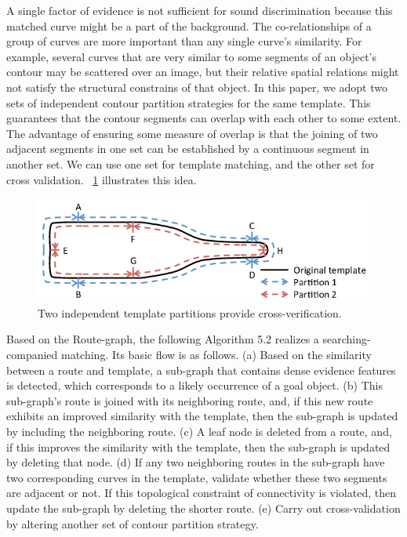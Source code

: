 \documentclass[journal]{IEEEtran}
\begin{document}
A single factor of evidence is not sufficient for sound discrimination because this matched curve might be a part of the background. 
The co-relationships of a group of curves are more important than any single curve's similarity. 
For example, several curves that are very similar to some segments of an object's contour may be scattered over an image, but their relative spatial relations might not satisfy the structural constrains of that object. 
In this paper, we adopt two sets of independent contour partition strategies for the same template. This guarantees that the contour segments can overlap with each other to some extent. The advantage of ensuring some measure of overlap is that the joining of two adjacent segments in one set can be established by a continuous segment in another set.
We can use one set for template matching, and the other set for cross validation. 
\figurename~\ref{fig:16} illustrates this idea.

\begin{figure}[!t]
\centering
\includegraphics[width=0.7\linewidth]{images/fig16.png}
\caption{Two independent template partitions provide cross-verification.}
\label{fig:16}
\end{figure}

Based on the Route-graph, the following Algorithm 5.2 realizes a searching-companied matching. 
Its basic flow is as follows. 
(a) Based on the similarity between a route and template, 
a sub-graph that contains dense evidence features is detected, 
which corresponds to a likely occurrence of a goal object. 
(b) This sub-graph's route is joined with its neighboring route, 
and, if this new route exhibits an improved similarity with the template, 
then the sub-graph is updated by including the neighboring route. 
(c) A leaf node is deleted from a route, 
and, if this improves the similarity with the template, 
then the sub-graph is updated by deleting that node. 
(d) If any two neighboring routes in the sub-graph have two corresponding curves in the template, 
validate whether these two segments are adjacent or not. 
If this topological constraint of connectivity is violated, 
then update the sub-graph by deleting the shorter route. 
(e) Carry out cross-validation by altering another set of contour partition strategy.
\end{document}

